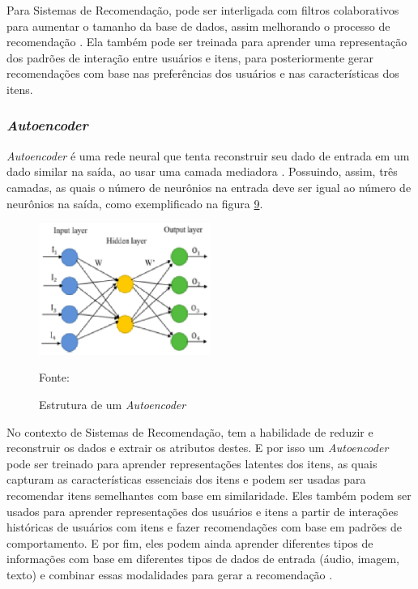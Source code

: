 Para Sistemas de Recomendação, pode ser interligada com filtros colaborativos para aumentar o tamanho da base de dados,
assim melhorando o processo de recomendação \cite{elSisi2020}. Ela também pode ser treinada para aprender uma representação
dos padrões de interação entre usuários e itens, para posteriormente gerar recomendações com base nas preferências dos
usuários e nas características dos itens.

\subsubsection{\textit{Autoencoder}}\label{subsubsec:autoencoder}
\textit{Autoencoder} é uma rede neural que tenta reconstruir seu dado de entrada em um dado similar na saída, ao usar uma
camada mediadora \cite{elSisi2020}. Possuindo, assim, três camadas, as quais o número de neurônios na entrada deve ser igual ao número de
neurônios na saída, como exemplificado na figura \hyperref[fig:autoencoder]{9}.
\begin{figure}[htbp]
    \centering
    \includegraphics[width=0.5\textwidth]{figuras/autoencoder.eps}
    \caption{Estrutura de um \textit{Autoencoder}}
    \label{fig:autoencoder}
    \small Fonte: \cite{elSisi2020}
\end{figure}

No contexto de Sistemas de Recomendação, tem a habilidade de reduzir e reconstruir os dados e extrair os atributos destes.
E por isso um \textit{Autoencoder} pode ser treinado para aprender representações latentes dos itens, as quais capturam as características
essenciais dos itens e podem ser usadas para recomendar itens semelhantes com base em similaridade. Eles também podem
ser usados para aprender representações dos usuários e itens a partir de interações históricas de usuários com itens e fazer
recomendações com base em padrões de comportamento. E por fim, eles podem ainda aprender diferentes tipos de informações com
base em diferentes tipos de dados de entrada (áudio, imagem, texto) e combinar essas modalidades para gerar a recomendação \cite{zhang2020autoencoder}.

